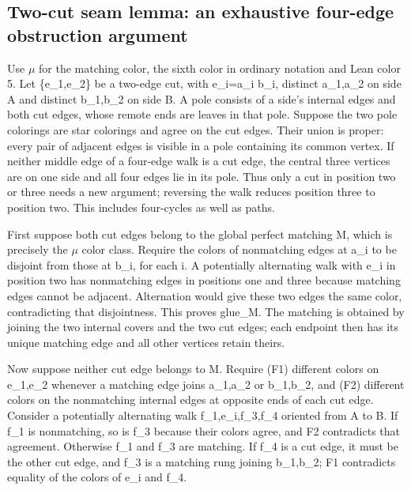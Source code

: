 \documentclass[11pt,a4paper]{article}
\begin{document}
\subsection{Two-cut seam lemma: an exhaustive four-edge obstruction argument}
Use \ensuremath{\mu} for the matching color, the sixth color in ordinary notation and Lean color 5. Let \{e\_1,e\_2\} be a two-edge cut, with e\_i=a\_i b\_i, distinct a\_1,a\_2 on side A and distinct b\_1,b\_2 on side B. A pole consists of a side's internal edges and both cut edges, whose remote ends are leaves in that pole. Suppose the two pole colorings are star colorings and agree on the cut edges. Their union is proper: every pair of adjacent edges is visible in a pole containing its common vertex. If neither middle edge of a four-edge walk is a cut edge, the central three vertices are on one side and all four edges lie in its pole. Thus only a cut in position two or three needs a new argument; reversing the walk reduces position three to position two. This includes four-cycles as well as paths.

First suppose both cut edges belong to the global perfect matching M, which is precisely the \ensuremath{\mu} color class. Require the colors of nonmatching edges at a\_i to be disjoint from those at b\_i, for each i. A potentially alternating walk with e\_i in position two has nonmatching edges in positions one and three because matching edges cannot be adjacent. Alternation would give these two edges the same color, contradicting that disjointness. This proves glue\_M. The matching is obtained by joining the two internal covers and the two cut edges; each endpoint then has its unique matching edge and all other vertices retain theirs.

Now suppose neither cut edge belongs to M. Require (F1) different colors on e\_1,e\_2 whenever a matching edge joins a\_1,a\_2 or b\_1,b\_2, and (F2) different colors on the nonmatching internal edges at opposite ends of each cut edge. Consider a potentially alternating walk f\_1,e\_i,f\_3,f\_4 oriented from A to B. If f\_1 is nonmatching, so is f\_3 because their colors agree, and F2 contradicts that agreement. Otherwise f\_1 and f\_3 are matching. If f\_4 is a cut edge, it must be the other cut edge, and f\_3 is a matching rung joining b\_1,b\_2; F1 contradicts equality of the colors of e\_i and f\_4.
\end{document}
